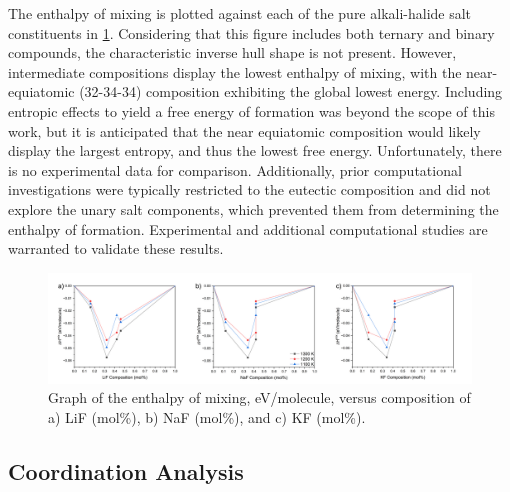 \documentclass[preprint,12pt]{elsarticle}
\begin{document}
The enthalpy of mixing is plotted against each of the pure alkali-halide salt constituents in \cref{fig:enth3comp}. Considering that this figure includes both ternary and binary compounds, the characteristic inverse hull shape is not present. However, intermediate compositions display the lowest enthalpy of mixing, with the near-equiatomic (32-34-34) composition exhibiting the global lowest energy. Including entropic effects to yield a free energy of formation was beyond the scope of this work, but it is anticipated that the near equiatomic composition would likely display the largest entropy, and thus the lowest free energy. Unfortunately, there is no experimental data for comparison. Additionally, prior computational investigations were typically restricted to the eutectic composition and did not explore the unary salt components, which prevented them from determining the enthalpy of formation. Experimental and additional computational studies are warranted to validate these results.



\begin{figure}[!ht]
    \centering
    \includegraphics[width=\textwidth]{enthalpyMixAll3_fixed_part2.png}
    \caption{Graph of the enthalpy of mixing, eV/molecule, versus composition of a) LiF (mol\%), b) NaF (mol\%), and c) KF (mol\%).}
    \label{fig:enth3comp}
\end{figure}


\FloatBarrier


\subsection{Coordination Analysis}
\end{document}
